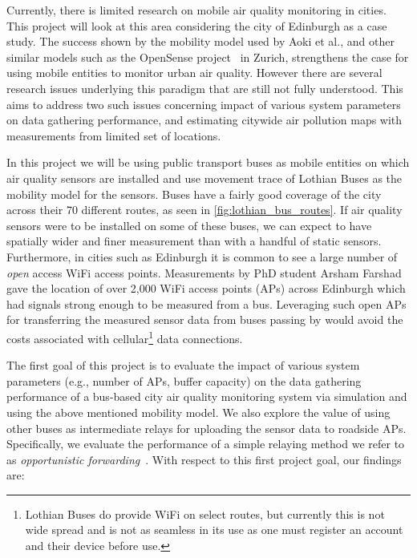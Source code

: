     Currently, there is limited research on mobile air quality monitoring in cities. This project will look at this area considering the city of Edinburgh as a case study. The success shown by the mobility model used by Aoki et al., and other similar models such as the OpenSense project~\cite{opensensezurich} in Zurich, strengthens the case for using mobile entities to monitor urban air quality. However there are several research issues underlying this paradigm that are still not fully understood. This aims to address two such issues concerning impact of various system parameters on data gathering performance, and estimating citywide air pollution maps with measurements from limited set of locations. 

    In this project we will be using public transport buses as mobile entities on which air quality sensors are installed and use movement trace of Lothian Buses as the mobility model for the sensors. Buses have a fairly good coverage of the city across their 70 different routes, as seen in \ref{fig:lothian_bus_routes}. If air quality sensors were to be installed on some of these buses, we can expect to have spatially wider and finer measurement than with a handful of static sensors. Furthermore, in cities such as Edinburgh it is common to see a large number of \emph{open} access WiFi access points. Measurements by PhD student Arsham Farshad gave the location of over 2,000 WiFi access points (APs) across Edinburgh which had signals strong enough to be measured from a bus. Leveraging such open APs for transferring the measured sensor data from buses passing by would avoid the costs associated with cellular\footnote{Lothian Buses do provide WiFi on select routes, but currently this is not wide spread and is not as seamless in its use as one must register an account and their device before use.} data connections. 


    The first goal of this project is to evaluate the impact of various system parameters (e.g., number of APs, buffer capacity) on the data gathering performance of a bus-based city air quality monitoring system via simulation and using the above mentioned mobility model. We also explore the value of using other buses as intermediate relays for uploading the sensor data to roadside APs. Specifically, we evaluate the performance of a simple relaying method we refer to as \emph{opportunistic forwarding}~\cite{opportunisticforwarding}. With respect to this first project goal, our findings are: 


